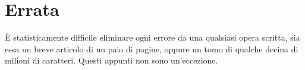 \section*{Errata}
È statisticamente difficile eliminare ogni errore da una qualsiasi opera scritta, sia
essa un breve articolo di un paio di pagine, oppure un tomo di qualche decina di milioni
di caratteri. Questi appunti non sono un'eccezione.